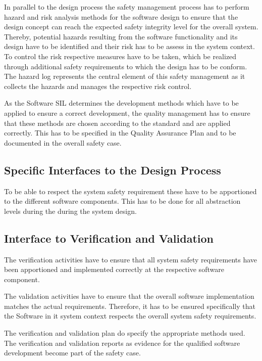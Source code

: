 \documentclass{template/openetcs_report}
\begin{document}
In parallel to the design process the safety management process has to perform hazard and risk analysis methods for the software design to ensure that the design concept can reach the expected safety integrity level for the overall system. Thereby, potential hazards resulting from the software functionality and its design have to be identified and their risk has to be assess in the system context. To control the risk respective measures have to be taken, which be realized through additional safety requirements to which the design has to be conform. The hazard log represents the central element of this safety management as it collects the hazards and manages the respective risk control.

As the Software SIL determines the development methods which have to be applied to ensure a correct development, the quality management has to ensure that these methods are chosen according to the standard and are applied correctly. This has to be specified in the Quality Assurance Plan and to be documented in the overall safety case. 

\subsection{Specific Interfaces to the Design Process}

To be able to respect the system safety requirement these have to be apportioned to the different software components. This has to be done for all abstraction levels during the during the system design. 

\subsection{Interface to Verification and Validation}

The verification activities have to ensure that all system safety requirements have been apportioned and implemented correctly at the respective software component.

The validation activities have to ensure that the overall software implementation matches the actual requirements. Therefore, it has to be ensured specifically that the Software in it system context respects the overall system safety requirements.

The verification and validation plan do specify the appropriate methods used. The verification and validation reports as evidence for the qualified software development become part of the safety case.
\end{document}
